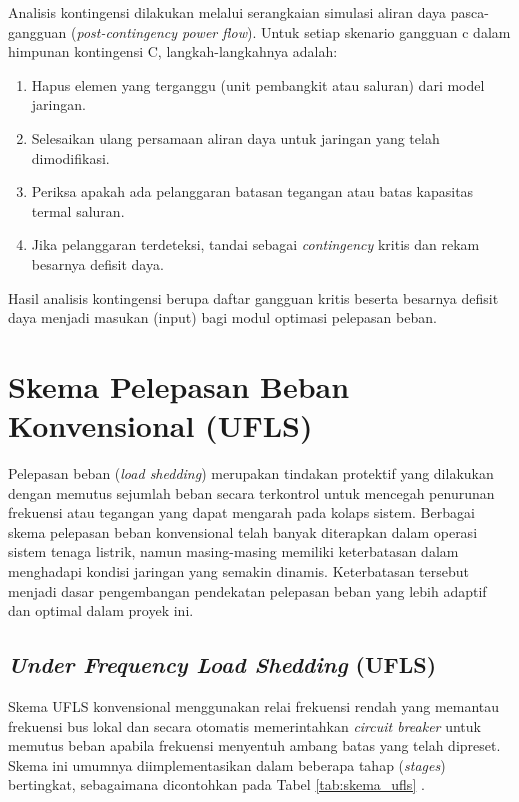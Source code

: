 Analisis kontingensi dilakukan melalui serangkaian simulasi aliran daya pasca-gangguan (\textit{post-contingency power flow}). Untuk setiap skenario gangguan c dalam himpunan kontingensi C, langkah-langkahnya adalah:
\begin{enumerate}
    \item Hapus elemen yang terganggu (unit pembangkit atau saluran) dari model jaringan.
    \item Selesaikan ulang persamaan aliran daya untuk jaringan yang telah dimodifikasi.
    \item Periksa apakah ada pelanggaran batasan tegangan atau batas kapasitas termal saluran.
    \item Jika pelanggaran terdeteksi, tandai sebagai \textit{contingency} kritis dan rekam besarnya defisit daya.
\end{enumerate}
Hasil analisis kontingensi berupa daftar gangguan kritis beserta besarnya defisit daya menjadi masukan (input) bagi modul optimasi pelepasan beban.

\section{Skema Pelepasan Beban Konvensional (UFLS)}
\label{sec:Skema_Pelepasan_Beban_Konvensional}

Pelepasan beban (\textit{load shedding}) merupakan tindakan protektif yang dilakukan dengan memutus sejumlah beban secara terkontrol untuk mencegah penurunan frekuensi atau tegangan yang dapat mengarah pada kolaps sistem. Berbagai skema pelepasan beban konvensional telah banyak diterapkan dalam operasi sistem tenaga listrik, namun masing-masing memiliki keterbatasan dalam menghadapi kondisi jaringan yang semakin dinamis. Keterbatasan tersebut menjadi dasar pengembangan pendekatan pelepasan beban yang lebih adaptif dan optimal dalam proyek ini.

\subsection{\textit{Under Frequency Load Shedding} (UFLS)}
\label{subsec:Under_Frequency_Load_Shedding}

Skema UFLS konvensional menggunakan relai frekuensi rendah yang memantau frekuensi bus lokal dan secara otomatis memerintahkan \textit{circuit breaker} untuk memutus beban apabila frekuensi menyentuh ambang batas yang telah dipreset. Skema ini umumnya diimplementasikan dalam beberapa tahap (\textit{stages}) bertingkat, sebagaimana dicontohkan pada Tabel \ref{tab:skema_ufls} \cite{IEEE1512_2023}.

